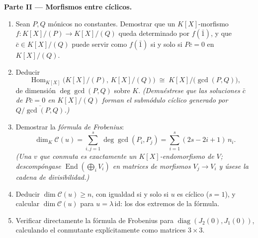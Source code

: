 \begin{problem}
\medskip
\noindent\textbf{Parte II --- Morfismos entre
 cíclicos.}
\begin{enumerate}[resume]
  \item Sean $P, Q$ mónicos no constantes. Demostrar que un
  $K[X]$-morfismo $f \colon K[X]/(P) \to K[X]/(Q)$ queda determinado por
  $f(\bar 1)$, y que $\bar c \in K[X]/(Q)$ puede servir como $f(\bar 1)$
  si y solo si $P\bar c = 0$ en $K[X]/(Q)$. \item Deducir
        \[
        \operatorname{Hom}_{K[X]}\bigl(K[X]/(P),\, K[X]/(Q)\bigr)
        \;\cong\; K[X]\big/\bigl(\gcd(P, Q)\bigr),
        \]
        de dimensión $\deg \gcd(P, Q)$ sobre $K$. \emph{(Demuéstrese que
        las soluciones $\bar c$ de $P\bar c = 0$ en $K[X]/(Q)$ forman el
        submódulo cíclico generado por
        $\overline{Q/\gcd(P,Q)}$.)}
  \item Demostrar la \emph{fórmula de Frobenius}:
        \[
        \dim_K \mathcal C(u) = \sum_{i,j=1}^{s} \deg\gcd(P_i,
        P_j) = \sum_{i=1}^{s} (2s - 2i + 1)\, n_i .
        \]
        \emph{(Una $v$ que conmuta es exactamente un $K[X]$-endomorfismo
        de $V$; descompóngase $\operatorname{End}(\bigoplus_i V_i)$ en
        matrices de morfismos $V_j \to V_i$ y úsese la cadena de
        divisibilidad.)} \item Deducir $\dim \mathcal C(u) \geq n$, con
        igualdad si y solo si $u$ es cíclico ($s = 1$), y calcular
        $\dim\mathcal C(u)$ para $u = \lambda\,\mathrm{id}$: los dos
        extremos de la fórmula. \item Verificar directamente la fórmula
        de Frobenius para $\operatorname{diag}(J_2(0), J_1(0))$,
        calculando el conmutante explícitamente como matrices
        $3\times3$.
\end{enumerate}


\end{problem}

